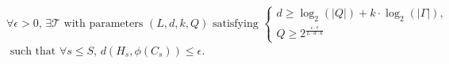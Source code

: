 \[
\forall \epsilon > 0, \, \exists \mathcal{T} \text{ with parameters } (L, d, k, Q) \text{ satisfying }
\begin{cases}
d \geq \log_2(|Q|) + k \cdot \log_2(|\Gamma|), \\
Q \geq 2^{\frac{\varepsilon \cdot \epsilon}{L \cdot d \cdot k}}
\end{cases}\]\(
\text{ such that } \forall s \leq S, \, d(H_s, \phi(C_s)) \leq \epsilon.
\)


